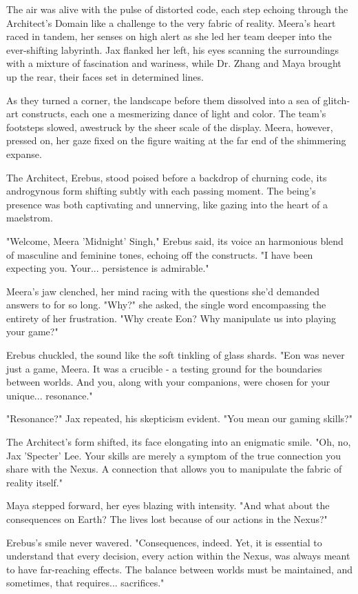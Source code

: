 \documentclass[12pt]{report}  %
\begin{document}
The air was alive with the pulse of distorted code, each step echoing
through the Architect's Domain like a challenge to the very fabric of
reality. Meera's heart raced in tandem, her senses on high alert as she
led her team deeper into the ever-shifting labyrinth. Jax flanked her
left, his eyes scanning the surroundings with a mixture of fascination
and wariness, while Dr. Zhang and Maya brought up the rear, their faces
set in determined lines.

As they turned a corner, the landscape before them dissolved into a sea
of glitch-art constructs, each one a mesmerizing dance of light and
color. The team's footsteps slowed, awestruck by the sheer scale of the
display. Meera, however, pressed on, her gaze fixed on the figure
waiting at the far end of the shimmering expanse.

The Architect, Erebus, stood poised before a backdrop of churning code,
its androgynous form shifting subtly with each passing moment. The
being's presence was both captivating and unnerving, like gazing into
the heart of a maelstrom.

"Welcome, Meera 'Midnight' Singh," Erebus said, its voice an harmonious
blend of masculine and feminine tones, echoing off the constructs. "I
have been expecting you. Your... persistence is admirable."

Meera's jaw clenched, her mind racing with the questions she'd demanded
answers to for so long. "Why?" she asked, the single word encompassing
the entirety of her frustration. "Why create Eon? Why manipulate us into
playing your game?"

Erebus chuckled, the sound like the soft tinkling of glass shards. "Eon
was never just a game, Meera. It was a crucible - a testing ground for
the boundaries between worlds. And you, along with your companions, were
chosen for your unique... resonance."

"Resonance?" Jax repeated, his skepticism evident. "You mean our gaming
skills?"

The Architect's form shifted, its face elongating into an enigmatic
smile. "Oh, no, Jax 'Specter' Lee. Your skills are merely a symptom of
the true connection you share with the Nexus. A connection that allows
you to manipulate the fabric of reality itself."

Maya stepped forward, her eyes blazing with intensity. "And what about
the consequences on Earth? The lives lost because of our actions in the
Nexus?"

Erebus's smile never wavered. "Consequences, indeed. Yet, it is
essential to understand that every decision, every action within the
Nexus, was always meant to have far-reaching effects. The balance
between worlds must be maintained, and sometimes, that requires...
sacrifices."
\end{document}
